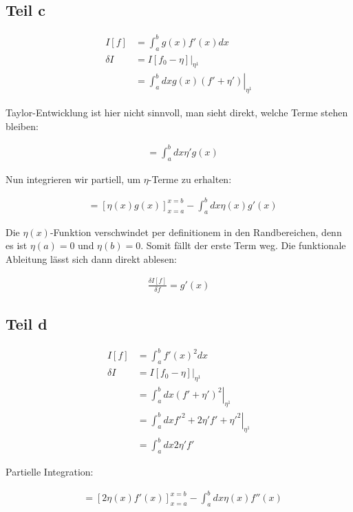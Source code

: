 \documentclass[a4paper,german,12pt,smallheadings]{scrartcl}
\begin{document}
\subsection*{Teil c}
\begin{align*}
  I[f] &= \int_a^b g(x)f'(x) dx \\
  \delta I &= \left.I[f_0 - \eta]\right|_{\eta^1} \\
  &=\left.\int_a^b dx g(x)(f' + \eta') \right|_{\eta^1}
\end{align*}

Taylor-Entwicklung ist hier nicht sinnvoll, man sieht direkt, welche Terme stehen bleiben:

\begin{align*}
  &=\int_a^b dx \eta' g(x)
\end{align*}

Nun integrieren wir partiell, um $\eta$-Terme zu erhalten:

\begin{align*}
  &=\left[\eta(x) g(x)\right]_{x=a}^{x=b} - \int_a^b dx \eta(x) g'(x)
\end{align*}

Die $\eta(x)$-Funktion verschwindet per definitionem in den Randbereichen, denn
es ist $\eta(a) = 0$ und $\eta(b) = 0$. Somit fällt der erste Term weg. Die
funktionale Ableitung lässt sich dann direkt ablesen:

\begin{align*}
  \frac{\delta I[f]}{\delta f} = g'(x)
\end{align*}

\subsection*{Teil d}
\begin{align*}
  I[f] &= \int_a^b f'(x)^2 dx \\
  \delta I &= \left.I[f_0 - \eta]\right|_{\eta^1} \\
  &=\left.\int_a^b dx (f' + \eta')^2 \right|_{\eta^1} \\
  &=\left.\int_a^b dx f'^2 + 2\eta'f' + \eta'^2 \right|_{\eta^1} \\
  &=\int_a^b dx 2\eta'f'
\end{align*}

Partielle Integration:

\begin{align*}
  &=\left[2\eta(x) f'(x)\right]_{x=a}^{x=b} - \int_a^b dx \eta(x) f''(x)
\end{align*}
\end{document}
